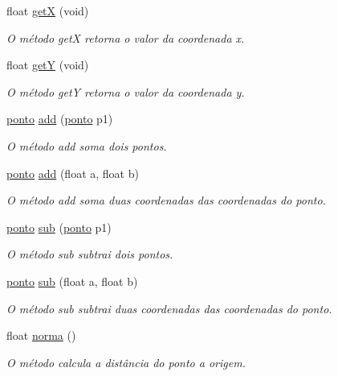 \begin{DoxyCompactItemize}
float \hyperlink{classponto_a4678950a1117e45b149f9a7cd3bb114d}{getX} (void)
\begin{DoxyCompactList}\small\item\em O método getX retorna o valor da coordenada x. \end{DoxyCompactList}\item 
float \hyperlink{classponto_a39aa79bee16cdf153e6434882ad342bc}{getY} (void)
\begin{DoxyCompactList}\small\item\em O método getY retorna o valor da coordenada y. \end{DoxyCompactList}\item 
\hyperlink{classponto}{ponto} \hyperlink{classponto_abbb3e8c2c0c74fba6c52e1b2c5ebfb76}{add} (\hyperlink{classponto}{ponto} p1)
\begin{DoxyCompactList}\small\item\em O método add soma dois pontos. \end{DoxyCompactList}\item 
\hyperlink{classponto}{ponto} \hyperlink{classponto_ae06f9e2b1b0bf804e58f871612c2ea54}{add} (float a, float b)
\begin{DoxyCompactList}\small\item\em O método add soma duas coordenadas das coordenadas do ponto. \end{DoxyCompactList}\item 
\hyperlink{classponto}{ponto} \hyperlink{classponto_ac2e219ffd3a478a4326792452c0af734}{sub} (\hyperlink{classponto}{ponto} p1)
\begin{DoxyCompactList}\small\item\em O método sub subtrai dois pontos. \end{DoxyCompactList}\item 
\hyperlink{classponto}{ponto} \hyperlink{classponto_ac2d3a9504aa439d716d20a2d87205959}{sub} (float a, float b)
\begin{DoxyCompactList}\small\item\em O método sub subtrai duas coordenadas das coordenadas do ponto. \end{DoxyCompactList}\item 
float \hyperlink{classponto_ab0c5fb0ddcd79fdb70fefe4cb6d7360e}{norma} ()
\begin{DoxyCompactList}\small\item\em O método calcula a distância do ponto a origem. \end{DoxyCompactList}\item 

\end{DoxyCompactItemize}
